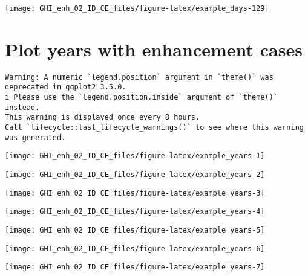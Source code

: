 \documentclass[
  10pt,
  a4paper,oneside]{article}
\begin{document}
\begin{center}\texttt{[image: GHI\_enh\_02\_ID\_CE\_files/figure-latex/example\_days-129]} \end{center}

\newpage
\FloatBarrier

\hypertarget{plot-years-with-enhancement-cases}{%
\section{Plot years with enhancement cases}\label{plot-years-with-enhancement-cases}}

\begin{verbatim}
Warning: A numeric `legend.position` argument in `theme()` was deprecated in ggplot2 3.5.0.
i Please use the `legend.position.inside` argument of `theme()` instead.
This warning is displayed once every 8 hours.
Call `lifecycle::last_lifecycle_warnings()` to see where this warning was generated.
\end{verbatim}

\begin{center}\texttt{[image: GHI\_enh\_02\_ID\_CE\_files/figure-latex/example\_years-1]} \end{center}

\begin{center}\texttt{[image: GHI\_enh\_02\_ID\_CE\_files/figure-latex/example\_years-2]} \end{center}

\begin{center}\texttt{[image: GHI\_enh\_02\_ID\_CE\_files/figure-latex/example\_years-3]} \end{center}

\begin{center}\texttt{[image: GHI\_enh\_02\_ID\_CE\_files/figure-latex/example\_years-4]} \end{center}

\begin{center}\texttt{[image: GHI\_enh\_02\_ID\_CE\_files/figure-latex/example\_years-5]} \end{center}

\begin{center}\texttt{[image: GHI\_enh\_02\_ID\_CE\_files/figure-latex/example\_years-6]} \end{center}

\begin{center}\texttt{[image: GHI\_enh\_02\_ID\_CE\_files/figure-latex/example\_years-7]} \end{center}
\end{document}
